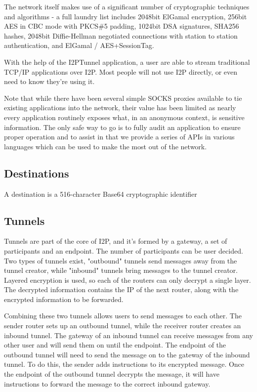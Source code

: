 \documentclass[a4paper,twocolumn,12pt]{article}
\begin{document}
The network itself makes use of a significant number of cryptographic techniques and algorithms - a full laundry list includes 2048bit ElGamal encryption, 256bit AES in CBC mode with PKCS\#5 padding, 1024bit DSA signatures, SHA256 hashes, 2048bit Diffie-Hellman negotiated connections with station to station authentication, and ElGamal / AES+SessionTag.

\vspace{2 em}

With the help of the I2PTunnel application, a user are able to stream traditional TCP/IP applications over I2P. Most people will not use I2P directly, or even need to know they're using it.

Note that while there have been several simple SOCKS proxies available to tie existing applications into the network, their value has been limited as nearly every application routinely exposes what, in an anonymous context, is sensitive information. The only safe way to go is to fully audit an application to ensure proper operation and to assist in that we provide a series of APIs in various languages which can be used to make the most out of the network.


\subsection{Destinations}

A destination is a 516-character Base64 cryptographic identifier

\subsection{Tunnels}

Tunnels are part of the core of I2P, and it's formed by a gateway, a set of participants and an endpoint. The number of participants can be user decided. Two types of tunnels exist, "outbound" tunnels send messages away from the tunnel creator, while "inbound" tunnels bring messages to the tunnel creator. Layered encryption is used, so each of the routers can only decrypt a single layer. The decrypted information contains the IP of the next router, along with the encrypted information to be forwarded.

Combining these two tunnels allows users to send messages to each other. The sender router sets up an outbound tunnel, while the receiver router creates an inbound tunnel. The gateway of an inbound tunnel can receive messages from any other user and will send them on until the endpoint. The endpoint of the outbound tunnel will need to send the message on to the gateway of the inbound tunnel. To do this, the sender adds instructions to its encrypted message. Once the endpoint of the outbound tunnel decrypts the message, it will have instructions to forward the message to the correct inbound gateway.
\end{document}
